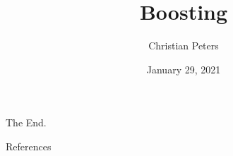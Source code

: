 \documentclass[10pt]{beamer}
\title{Boosting}
\date{January 29, 2021}
\author{Christian Peters}
\begin{document}
\maketitle





	




\begin{frame}[standout]
  The End.
\end{frame}

\appendix

\begin{frame}[allowframebreaks]{References}

  \nocite{SSBD14, FREUND1997119, kv-lbffahf-88, boosting}

  
  

\end{frame}
\end{document}

